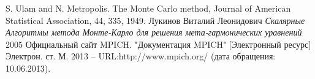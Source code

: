 \newpage
\begin{thebibliography}{99}
		S. Ulam and N. Metropolis. The Monte Carlo method, Journal of American Statistical Association, 44, 335, 1949.
	 Лукинов Виталий Леонидович \emph{Скалярные Алгоритмы метода Монте-Карло для решения мета-гармонических уравнений} 2005
	Официальный сайт MPICH. "Документация MPICH" [Электронный ресурс] Электрон. ст. М. 2013 – URL:http://www.mpich.org/ (дата обращения: 10.06.2013).
\end{thebibliography}

